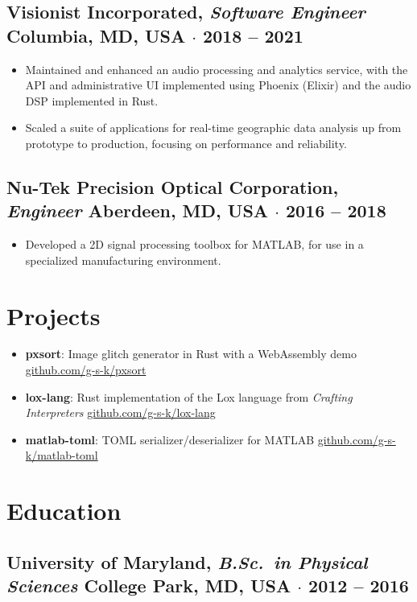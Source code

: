 \documentclass[10pt]{article}
\newcommand{\entry}[4]{%
  \subsection*{#1, \textnormal{\normalsize\textit{#3}}%
    \hfill \textnormal{\small #2 $\cdot$ #4}}%
}
\newcommand{\project}[3]{%
  \item \textbf{#1}: #3 \hfill {\small\href{https://#2}{#2}}%
}
\begin{document}
\entry{Visionist Incorporated}{Columbia, MD, USA}{Software Engineer}{2018 -- 2021}
\begin{itemize}
  \item Maintained and enhanced an audio processing and analytics service, with
    the API and administrative UI implemented using Phoenix (Elixir) and the
    audio DSP implemented in Rust.
  \item Scaled a suite of applications for real-time geographic data analysis
    up from prototype to production, focusing on performance and reliability.
\end{itemize}

\entry{Nu-Tek Precision Optical Corporation}{Aberdeen, MD, USA}{Engineer}{2016 -- 2018}
\begin{itemize}
  \item Developed a 2D signal processing toolbox for MATLAB, for use in a
    specialized manufacturing environment.
\end{itemize}

\dotfill

\section*{Projects}
\begin{itemize}
    \project{pxsort}{github.com/g-s-k/pxsort}{Image glitch generator in Rust with a WebAssembly demo}
    \project{lox-lang}{github.com/g-s-k/lox-lang}{Rust implementation of the Lox language from \textit{Crafting Interpreters}}
    \project{matlab-toml}{github.com/g-s-k/matlab-toml}{TOML serializer/deserializer for MATLAB}
\end{itemize}

\dotfill

\section*{Education}
\entry{University of Maryland}{College Park, MD, USA}{B.Sc.\ in Physical Sciences}{2012 -- 2016}
\end{document}

